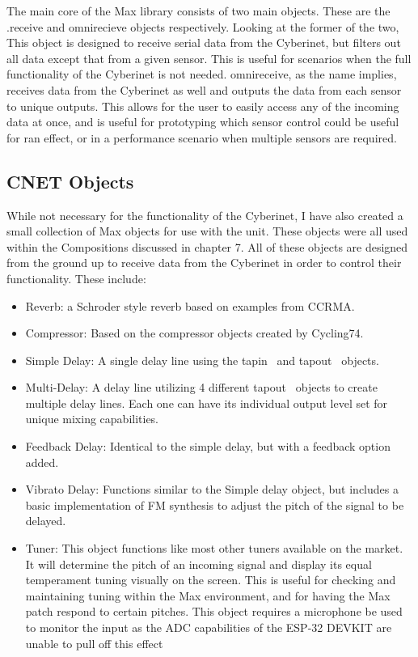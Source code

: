 The main core of the Max library consists of two main objects. These are the .receive and omnirecieve objects respectively. Looking at the former of the two, This object is designed to receive serial data from the Cyberinet, but filters out all data except that from a given sensor. This is useful for scenarios when the full functionality of the Cyberinet is not needed. omnireceive, as the name implies, receives data from the Cyberinet as well and outputs the data from each sensor to unique outputs. This allows for the user to easily access any of the incoming data at once, and is useful for prototyping which sensor control could be useful for ran effect, or in a performance scenario when multiple sensors are required.

\subsection{CNET Objects}

While not necessary for the functionality of the Cyberinet, I have also created a small collection of Max objects for use with the unit. These objects were all used within the Compositions discussed in chapter 7. All of these objects are designed from the ground up to receive data from the Cyberinet in order to control their functionality. These include:

\begin{itemize}
    \item Reverb: a Schroder style reverb based on examples from CCRMA.
    \item Compressor: Based on the compressor objects created by Cycling74.
    \item Simple Delay: A single delay line using the tapin~ and tapout~ objects. 
    \item Multi-Delay: A delay line utilizing 4 different tapout~ objects to create multiple delay lines. Each one can have its individual output level set for unique mixing capabilities.
    \item Feedback Delay: Identical to the simple delay, but with a feedback option added.
    \item Vibrato Delay: Functions similar to the Simple delay object, but includes a basic implementation of FM synthesis to adjust the pitch of the signal to be delayed. 
    \item Tuner: This object functions like most other tuners available on the market. It will determine the pitch of an incoming signal and display its equal temperament tuning visually on the screen. This is useful for checking and maintaining tuning within the Max environment, and for having the Max patch respond to certain pitches. This object requires a microphone be used to monitor the input as the ADC capabilities of the ESP-32 DEVKIT are unable to pull off this effect
\end{itemize}

